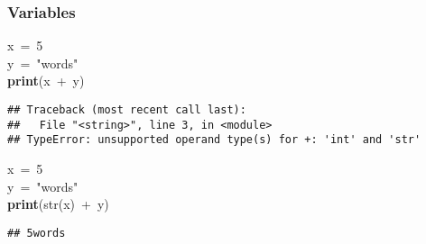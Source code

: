 \documentclass{beamer}\usepackage[]{graphicx}\usepackage[]{color}
\makeatletter
\newcommand{\hlnum}[1]{\textcolor[rgb]{0.686,0.059,0.569}{#1}}%
\newcommand{\hlstr}[1]{\textcolor[rgb]{0.192,0.494,0.8}{#1}}%
\newcommand{\hlopt}[1]{\textcolor[rgb]{0,0,0}{#1}}%
\newcommand{\hlstd}[1]{\textcolor[rgb]{0.345,0.345,0.345}{#1}}%
\newcommand{\hlkwa}[1]{\textcolor[rgb]{0.161,0.373,0.58}{\textbf{#1}}}%
\newcommand{\hlkwb}[1]{\textcolor[rgb]{0.69,0.353,0.396}{#1}}%
\newenvironment{kframe}{%
 \def\at@end@of@kframe{}%
 \ifinner\ifhmode%
  \def\at@end@of@kframe{\end{minipage}}%
  \begin{minipage}{\columnwidth}%
 \fi\fi%
 \def\FrameCommand##1{\hskip\@totalleftmargin \hskip-\fboxsep
 \colorbox{shadecolor}{##1}\hskip-\fboxsep
     \hskip-\linewidth \hskip-\@totalleftmargin \hskip\columnwidth}%
 \MakeFramed {\advance\hsize-\width
   \@totalleftmargin\z@ \linewidth\hsize
   \@setminipage}}%
 {\par\unskip\endMakeFramed%
 \at@end@of@kframe}
\newenvironment{knitrout}{}{} %
\makeatother
\begin{document}
\begin{frame}[fragile]
\frametitle{Variables}
\begin{knitrout}
\color{fgcolor}\begin{kframe}
\noindent
\ttfamily
\hlstd{x\ }\hlopt{=\ }\hlstd{}\hlnum{5}\hspace*{\fill}\\
\hlstd{y\ }\hlopt{=\ }\hlstd{}\hlstr{"words"}\hlstd{}\hspace*{\fill}\\
\hlkwa{print}\hlstd{}\hlopt{(}\hlstd{x\ }\hlopt{+\ }\hlstd{y}\hlopt{)}\hlstd{}\hspace*{\fill}
\mbox{}
\normalfont

\begin{verbatim}
## Traceback (most recent call last):
##   File "<string>", line 3, in <module>
## TypeError: unsupported operand type(s) for +: 'int' and 'str'
\end{verbatim}
\end{kframe}
\end{knitrout}

\begin{knitrout}
\color{fgcolor}\begin{kframe}
\noindent
\ttfamily
\hlstd{x\ }\hlopt{=\ }\hlstd{}\hlnum{5}\hspace*{\fill}\\
\hlstd{y\ }\hlopt{=\ }\hlstd{}\hlstr{"words"}\hlstd{}\hspace*{\fill}\\
\hlkwa{print}\hlstd{}\hlopt{(}\hlstd{}\hlkwb{str}\hlstd{}\hlopt{(}\hlstd{x}\hlopt{)\ +\ }\hlstd{y}\hlopt{)}\hlstd{}\hspace*{\fill}
\mbox{}
\normalfont

\begin{verbatim}
## 5words
\end{verbatim}
\end{kframe}
\end{knitrout}
\end{frame}
\end{document}
